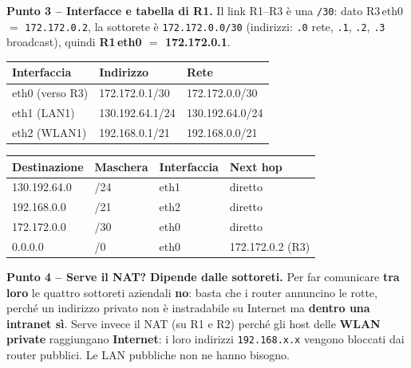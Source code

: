 \documentclass[12pt, a4paper]{article}
\begin{document}
\begin{tcolorbox}[colback=orange!5, colframe=orange!70!black, title=\textbf{Esercizio B.3 -- ``Company'' (traccia d'esame Lo Cigno)}]
\textbf{Punto 3 -- Interfacce e tabella di R1.} Il link R1--R3 è una \texttt{/30}: dato R3\,eth0 $=$ \texttt{172.172.0.2}, la sottorete è \texttt{172.172.0.0/30} (indirizzi: \texttt{.0} rete, \texttt{.1}, \texttt{.2}, \texttt{.3} broadcast), quindi \textbf{R1\,eth0 $=$ 172.172.0.1}.
\begin{center}
\small
\begin{tabular}{lll}
\toprule
\textbf{Interfaccia} & \textbf{Indirizzo} & \textbf{Rete} \\
\midrule
eth0 (verso R3) & 172.172.0.1/30 & 172.172.0.0/30 \\
eth1 (LAN1) & 130.192.64.1/24 & 130.192.64.0/24 \\
eth2 (WLAN1) & 192.168.0.1/21 & 192.168.0.0/21 \\
\bottomrule
\end{tabular}
\end{center}
\begin{center}
\small
\begin{tabular}{llll}
\toprule
\textbf{Destinazione} & \textbf{Maschera} & \textbf{Interfaccia} & \textbf{Next hop} \\
\midrule
130.192.64.0 & /24 & eth1 & diretto \\
192.168.0.0 & /21 & eth2 & diretto \\
172.172.0.0 & /30 & eth0 & diretto \\
0.0.0.0 & /0 & eth0 & 172.172.0.2 (R3) \\
\bottomrule
\end{tabular}
\end{center}

\textbf{Punto 4 -- Serve il NAT?} \textcolor{blue!70!black}{\textbf{Dipende dalle sottoreti.}} Per far comunicare \textbf{tra loro} le quattro sottoreti aziendali \textbf{no}: basta che i router annuncino le rotte, perché un indirizzo privato non è instradabile su Internet ma \textbf{dentro una intranet sì}. Serve invece il NAT (su R1 e R2) perché gli host delle \textbf{WLAN private} raggiungano \textbf{Internet}: i loro indirizzi \texttt{192.168.x.x} vengono bloccati dai router pubblici. Le LAN pubbliche non ne hanno bisogno.


\end{tcolorbox}
\end{document}
